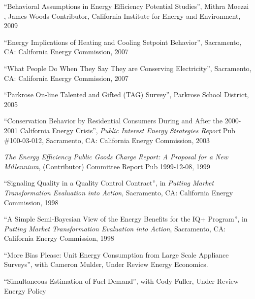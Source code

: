\documentclass[Computer Science]{vita}
\begin{document}
\begin{vita}
\begin{Publications}
\begin{Unrefereed Public Reports}
    \item ``Behavioral Assumptions in Energy Efficiency Potential
      Studies'', Mithra Moezzi , James Woods Contributor, California
      Institute for Energy and Environment, 2009

    \item ``Energy Implications of Heating and Cooling Setpoint
      Behavior'', Sacramento, CA: California Energy Commission, 2007

    \item ``What People Do When They Say They are Conserving
      Electricity'', Sacramento, CA: California Energy Commission,
      2007

    \item ``Parkrose On-line Talented and Gifted (TAG) Survey'',
      Parkrose School District, 2005

    \item ``Conservation Behavior by Residential Consumers During and
      After the 2000-2001 California Energy Crisis'', \emph{Public
        Interest Energy Strategies Report} Pub \#100-03-012,
      Sacramento, CA: California Energy Commission, 2003

    \item \emph{The Energy Efficiency Public Goods Charge Report: A
        Proposal for a New Millennium}, (Contributor) Committee Report
      Pub 1999-12-08, 1999
	
    \item ``Signaling Quality in a Quality Control Contract'', in
      \emph{Putting Market Transformation Evaluation into Action},
      Sacramento, CA: California Energy Commission, 1998
	
    \item ``A Simple Semi-Bayesian View of the Energy Benefits for the
      IQ+ Program'', in \emph{Putting Market Transformation Evaluation
        into Action}, Sacramento, CA: California Energy Commission,
      1998
	
    \end{Unrefereed Public Reports}
  
    \begin{Work in progress}
\item ``More Bias Please: Unit Energy Consumption from Large Scale Appliance Surveys'', with Cameron Mulder, Under Review Energy Economics.

\item ``Simultaneous Estimation of Fuel Demand'', with Cody Fuller, Under Review Energy Policy
 

\end{Work in progress}
\end{Publications}
\end{vita}
\end{document}
